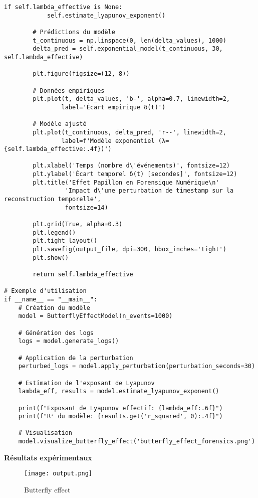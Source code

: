 \documentclass[12pt,a4paper]{article}
\begin{document}
\begin{lstlisting}[caption=Modélisation de l'effet papillon forensique]
        if self.lambda_effective is None:
            self.estimate_lyapunov_exponent()
        
        # Prédictions du modèle
        t_continuous = np.linspace(0, len(delta_values), 1000)
        delta_pred = self.exponential_model(t_continuous, 30, self.lambda_effective)
        
        plt.figure(figsize=(12, 8))
        
        # Données empiriques
        plt.plot(t, delta_values, 'b-', alpha=0.7, linewidth=2, 
                label='Écart empirique δ(t)')
        
        # Modèle ajusté
        plt.plot(t_continuous, delta_pred, 'r--', linewidth=2,
                label=f'Modèle exponentiel (λ={self.lambda_effective:.4f})')
        
        plt.xlabel('Temps (nombre d\'événements)', fontsize=12)
        plt.ylabel('Écart temporel δ(t) [secondes]', fontsize=12)
        plt.title('Effet Papillon en Forensique Numérique\n'
                 'Impact d\'une perturbation de timestamp sur la reconstruction temporelle', 
                 fontsize=14)
        
        plt.grid(True, alpha=0.3)
        plt.legend()
        plt.tight_layout()
        plt.savefig(output_file, dpi=300, bbox_inches='tight')
        plt.show()
        
        return self.lambda_effective

# Exemple d'utilisation
if __name__ == "__main__":
    # Création du modèle
    model = ButterflyEffectModel(n_events=1000)
    
    # Génération des logs
    logs = model.generate_logs()
    
    # Application de la perturbation
    perturbed_logs = model.apply_perturbation(perturbation_seconds=30)
    
    # Estimation de l'exposant de Lyapunov
    lambda_eff, results = model.estimate_lyapunov_exponent()
    
    print(f"Exposant de Lyapunov effectif: {lambda_eff:.6f}")
    print(f"R² du modèle: {results.get('r_squared', 0):.4f}")
    
    # Visualisation
    model.visualize_butterfly_effect('butterfly_effect_forensics.png')
\end{lstlisting}

\textbf{Résultats expérimentaux}
\begin{figure}[H]
    \centering
    \texttt{[image: output.png]}
    \caption{Butterfly effect}
    \label{fig:evolution_regimes}
\end{figure}
\end{document}
